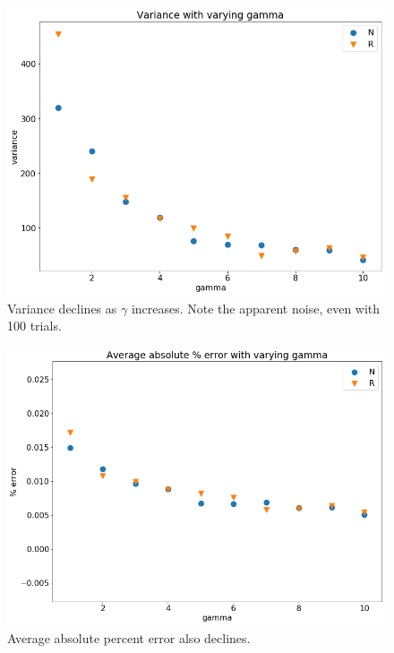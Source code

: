 \documentclass{beamer}
\begin{document}
\begin{frame}
    \begin{figure}
        \centering
        \includegraphics[width=0.7\linewidth]{figs/gamma-variance.png}
        \caption{Variance declines as $\gamma$ increases. Note the apparent noise, even with 100 trials.}
        \label{fig:gamma-variance}
    \end{figure}
\end{frame}

\begin{frame}
    \begin{figure}
        \centering
        \includegraphics[width=0.7\linewidth]{figs/gamma-error.png}
        \caption{Average absolute percent error also declines.}
        \label{fig:gamma-error}
    \end{figure}
\end{frame}
\end{document}
